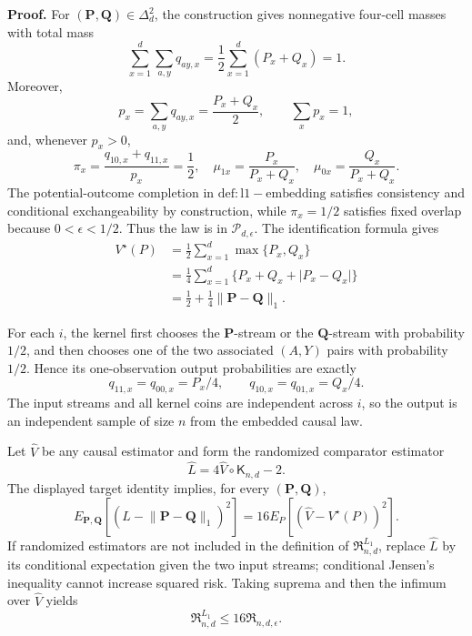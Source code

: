 \textbf{Proof.}
For \((\mathbf P,\mathbf Q)\in\Delta_d^2\), the construction gives nonnegative four-cell masses with total mass
\[
 \sum_{x=1}^d\sum_{a,y}q_{ay,x}
 =\frac12\sum_{x=1}^d(P_x+Q_x)=1.
\]
Moreover,
\[
 p_x=\sum_{a,y}q_{ay,x}=\frac{P_x+Q_x}{2},
 \qquad
 \sum_xp_x=1,
\]
and, whenever \(p_x>0\),
\[
 \pi_x=\frac{q_{10,x}+q_{11,x}}{p_x}=\frac12,
 \quad
 \mu_{1x}=\frac{P_x}{P_x+Q_x},
 \quad
 \mu_{0x}=\frac{Q_x}{P_x+Q_x}.
\]
The potential-outcome completion in \(\mathrm{def:l1-embedding}\) satisfies consistency and conditional exchangeability by construction, while \(\pi_x=1/2\) satisfies fixed overlap because \(0<\epsilon<1/2\).  Thus the law is in \(\mathcal P_{d,\epsilon}\).  The identification formula gives
\[
 \begin{aligned}
 V^\star(P)
 &=\frac12\sum_{x=1}^d\max\{P_x,Q_x\}\\
 &=\frac14\sum_{x=1}^d\{P_x+Q_x+\lvert P_x-Q_x\rvert\}\\
 &=\frac12+\frac14\lVert\mathbf P-\mathbf Q\rVert_1.
 \end{aligned}
\]

For each \(i\), the kernel first chooses the \(\mathbf P\)-stream or the \(\mathbf Q\)-stream with probability \(1/2\), and then chooses one of the two associated \((A,Y)\) pairs with probability \(1/2\).  Hence its one-observation output probabilities are exactly
\[
 q_{11,x}=q_{00,x}=P_x/4,
 \qquad
 q_{10,x}=q_{01,x}=Q_x/4.
\]
The input streams and all kernel coins are independent across \(i\), so the output is an independent sample of size \(n\) from the embedded causal law.

Let \(\widehat V\) be any causal estimator and form the randomized comparator estimator
\[
 \widehat L=4\widehat V\circ\mathsf K_{n,d}-2.
\]
The displayed target identity implies, for every \((\mathbf P,\mathbf Q)\),
\[
 E_{\mathbf P,\mathbf Q}\!\left[
   (\widehat L-\lVert\mathbf P-\mathbf Q\rVert_1)^2
 \right]
 =16E_P[(\widehat V-V^\star(P))^2].
\]
If randomized estimators are not included in the definition of \(\mathfrak R^{L_1}_{n,d}\), replace \(\widehat L\) by its conditional expectation given the two input streams; conditional Jensen's inequality cannot increase squared risk.  Taking suprema and then the infimum over \(\widehat V\) yields
\[
 \mathfrak R^{L_1}_{n,d}\le16\mathfrak R_{n,d,\epsilon}.
\]

